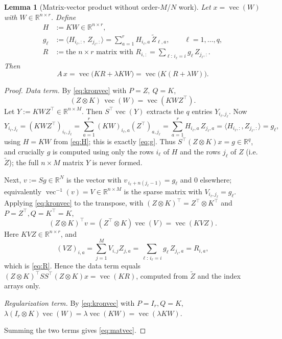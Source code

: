 \documentclass[12pt]{article}
\DeclareMathOperator{\vecop}{vec}
\newcommand{\bR}{\mathbb{R}}
\newtheorem{lemma}{Lemma}
\theoremstyle{remark}
\begin{document}
\begin{lemma}[Matrix-vector product without order-$M$/$N$ work]\label{lem:matvec}
Let $x=\vecop(W)$ with $W\in\bR^{n\times r}$. Define
\begin{align}
  H &:= KW \in \bR^{n\times r}, \label{eq:H}\\
  g_\ell &:= \langle H_{i_\ell,:},\, Z_{j_\ell,:}\rangle = \sum_{a=1}^r H_{i_\ell,a}\,\tilde Z_{\ell,a},\qquad \ell=1,\dots,q, \label{eq:g}\\
  R &:= \text{the } n\times r \text{ matrix with } R_{i,:} = \sum_{\ell:\,i_\ell=i} g_\ell\, Z_{j_\ell,:}. \label{eq:R}
\end{align}
Then
\begin{equation}\label{eq:matvec}
  A\,x = \vecop\!\big(K R + \lambda K W\big) = \vecop\!\big(K(R+\lambda W)\big).
\end{equation}
\end{lemma}

\begin{proof}
\emph{Data term.} By \eqref{eq:kronvec} with $P=Z,\ Q=K$,
\[
  (Z\otimes K)\,\vecop(W) = \vecop\!\left(K W Z^{\!\top}\right).
\]
Let $Y:=KWZ^{\!\top}\in\bR^{n\times M}$. Then $S^{\!\top}\vecop(Y)$ extracts the $q$ entries $Y_{i_\ell,j_\ell}$. Now
\[
  Y_{i_\ell,j_\ell}=(KW Z^{\!\top})_{i_\ell,j_\ell}
  =\sum_{a=1}^r (KW)_{i_\ell,a}(Z^{\!\top})_{a,j_\ell}
  =\sum_{a=1}^r H_{i_\ell,a}\,Z_{j_\ell,a}
  =\langle H_{i_\ell,:},Z_{j_\ell,:}\rangle = g_\ell,
\]
using $H=KW$ from \eqref{eq:H}; this is exactly \eqref{eq:g}. Thus $S^{\!\top}(Z\otimes K)x = g\in\bR^q$, and crucially $g$ is computed using only the rows $i_\ell$ of $H$ and the rows $j_\ell$ of $Z$ (i.e.\ $\tilde Z$); the full $n\times M$ matrix $Y$ is never formed.

Next, $v:=S g\in\bR^N$ is the vector with $v_{\,i_\ell+n(j_\ell-1)}=g_\ell$ and $0$ elsewhere; equivalently $\vecop^{-1}(v)=V\in\bR^{n\times M}$ is the sparse matrix with $V_{i_\ell,j_\ell}=g_\ell$. Applying \eqref{eq:kronvec} to the transpose, with $(Z\otimes K)^{\!\top}=Z^{\!\top}\otimes K^{\!\top}$ and $P=Z^{\!\top},Q=K^{\!\top}=K$,
\[
  (Z\otimes K)^{\!\top} v = (Z^{\!\top}\otimes K)\vecop(V) = \vecop\!\left(K V Z\right).
\]
Here $KVZ\in\bR^{n\times r}$, and
\[
  (VZ)_{i,a}=\sum_{j=1}^M V_{i,j}Z_{j,a}=\sum_{\ell:\,i_\ell=i} g_\ell\, Z_{j_\ell,a}=R_{i,a},
\]
which is \eqref{eq:R}. Hence the data term equals $(Z\otimes K)^{\!\top}SS^{\!\top}(Z\otimes K)x=\vecop(KR)$, computed from $\tilde Z$ and the index arrays only.

\emph{Regularization term.} By \eqref{eq:kronvec} with $P=I_r,Q=K$,
$\lambda(I_r\otimes K)\vecop(W)=\lambda\vecop(KW)=\vecop(\lambda KW)$.

Summing the two terms gives \eqref{eq:matvec}.
\end{proof}
\end{document}
